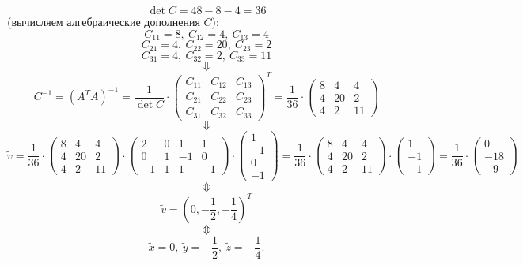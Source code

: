 \documentclass{article}
\begin{document}
$$\det C = 48-8-4=36$$
(вычисляем алгебраические дополнения $C$):
$$C_{11}=8,\ C_{12}=4,\ C_{13}=4$$
$$C_{21}=4,\ C_{22}=20,\ C_{23}=2$$
$$C_{31}=4,\ C_{32}=2,\ C_{33}=11$$
$$\Downarrow$$
$$C^{-1}=(A^TA)^{-1}=\frac{1}{\det C}\cdot\left(\begin{array}{rrr}C_{11} & C_{12} & C_{13}\\C_{21} & C_{22} & C_{23}\\C_{31} & C_{32} & C_{33}\end{array}\right)^T=\frac{1}{36}\cdot\left(\begin{array}{rrr}8 & 4 & 4\\4 & 20 & 2\\4 & 2 & 11\end{array}\right)$$
$$\Downarrow$$
$$\tilde v = \frac{1}{36}\cdot\left(\begin{array}{rrr}8 & 4 & 4\\4 & 20 & 2\\4 & 2 & 11\end{array}\right)\cdot\left(\begin{array}{rrrr}2 & 0 & 1 & 1\\0 & 1 & -1 & 0\\-1 & 1 & 1 & -1\end{array}\right)\cdot\left(\begin{array}{r}1\\-1\\0\\-1\end{array}\right)=\frac{1}{36}\cdot\left(\begin{array}{rrr}8 & 4 & 4\\4 & 20 & 2\\4 & 2 & 11\end{array}\right)\cdot\left(\begin{array}{r}1\\-1\\-1\end{array}\right)=\frac{1}{36}\cdot\left(\begin{array}{r}0\\-18\\-9\end{array}\right)$$
$$\Updownarrow$$
$$\tilde v = (0, -\frac{1}{2}, -\frac{1}{4})^T$$
$$\Updownarrow$$
$$\tilde x = 0,\ \tilde y=-\frac{1}{2},\ \tilde z=-\frac{1}{4}.$$
\end{document}
